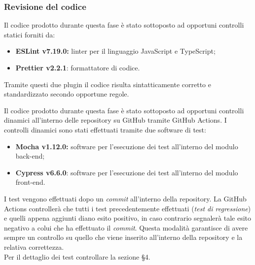 \subsubsection{Revisione del codice}

Il codice prodotto durante questa fase è stato sottoposto ad opportuni controlli statici forniti da:
\begin{itemize}
	\item \textbf{ESLint v7.19.0:} linter per il linguaggio JavaScript e TypeScript;
	\item \textbf{Prettier v2.2.1}: formattatore di codice.
\end{itemize}

Tramite questi due plugin il codice risulta sintatticamente corretto e standardizzato secondo opportune regole.

Il codice prodotto durante questa fase è stato sottoposto ad opportuni controlli dinamici all'interno delle repository su GitHub tramite GitHub Actions. I controlli dinamici sono stati effettuati tramite due software di test:
\begin{itemize}
	\item \textbf{Mocha v1.12.0:} software per l'esecuzione dei test all'interno del modulo back-end;
	\item \textbf{Cypress v6.6.0}: software per l'esecuzione dei test all'interno del modulo front-end.
\end{itemize}

I test vengono effettuati dopo un \textit{commit} all'interno della repository. La GitHub Actions controllerà che tutti i test precedentemente effettuati (\textit{test di regressione}) e quelli appena aggiunti diano esito positivo, in caso contrario segnalerà tale esito negativo a colui che ha effettuato il \textit{commit}. Questa modalità garantisce di avere sempre un controllo su quello che viene inserito all'interno della repository e la relativa correttezza.\\
Per il dettaglio dei test controllare la sezione \S{4}.